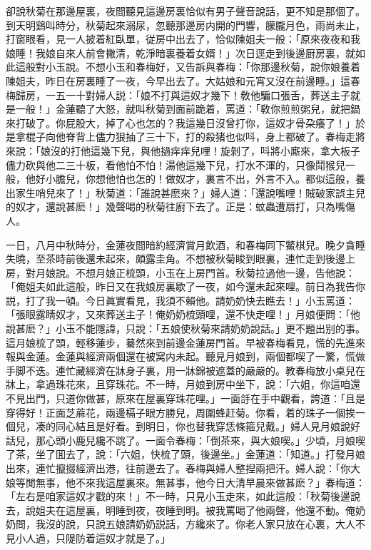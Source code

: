 卻說秋菊在那邊屋裏，夜間聽見這邊房裏恰似有男子聲音說話，更不知是那個了。到天明鷄叫時分，秋菊起來溺尿，忽聽那邊房内開的門響，朦朧月色，雨尚未止，打窗眼看，見一人披着紅臥單，従房中出去了，恰似陳姐夫一般：「原來夜夜和我娘睡！我娘自來人前會撇清，乾淨暗裏養着女婿！」次日逕走到後邊厨房裏，就如此這般對小玉說。不想小玉和春梅好，又告訴與春梅：「你那邊秋菊，說你娘養着陳姐夫，昨日在房裏睡了一夜，今早出去了。大姑娘和元宵又沒在前邊睡。」這春梅歸房，一五一十對婦人説：「娘不打與這奴才幾下！敎他騙口張舌，葬送主子就是一般！」金蓮聽了大怒，就叫秋菊到面前跪着，罵道：「敎你煎煎粥兒，就把鍋來打破了。你屁股大，掉了心也怎的？我這幾日沒曾打你，這奴才骨朶癢了！」於是拿棍子向他脊背上儘力狠抽了三十下，打的殺猪也似呌，身上都破了。春梅走將來說：「娘沒的打他這幾下兒，與他撾痒痒兒哩！旋剝了，呌將小廝來，拿大板子儘力砍與他二三十板，看他怕不怕！湯他這幾下兒，打水不渾的，只像鬦猴兒一般，他好小膽兒，你想他怕也怎的！做奴才，裏言不出，外言不入。都似這般，養出家生哨兒來了！」秋菊道：「誰說甚麽來？」婦人道：「還說嘴哩！賊破家誤主兒的奴才，還說甚麽！」幾聲喝的秋菊往廚下去了。正是：蚊蟲遭扇打，只為嘴傷人。

一日，八月中秋時分，金蓮夜間暗約經濟賞月飲酒，和春梅同下鱉棋兒。晚夕貪睡失曉，至茶時前後還未起來，頗露圭角。不想被秋菊睃到眼裏，連忙走到後邊上房，對月娘說。不想月娘正梳頭，小玉在上房門首。秋菊拉過他一邊，告他說：「俺姐夫如此這般，昨日又在我娘房裏歇了一夜，如今還未起來哩。前日為我告你説，打了我一頓。今日眞實看見，我須不賴他。請奶奶快去瞧去！」小玉罵道：「張眼露睛奴才，又來葬送主子！俺奶奶梳頭哩，還不快走哩！」月娘便問：「他說甚麽？」小玉不能隱諱，只說：「五娘使秋菊來請奶奶說話。」更不題出别的事。這月娘梳了頭，輕移蓮步，驀然來到前邊金蓮房門首。早被春梅看見，慌的先進來報與金蓮。金蓮與經濟兩個還在被窝内未起。聽見月娘到，兩個都喫了一驚，慌做手脚不迭。連忙藏經濟在牀身子裏，用一牀錦被遮蓋的嚴嚴的。教春梅放小桌兒在牀上，拿過珠花來，且穿珠花。不一時，月娘到房中坐下，說：「六姐，你這咱還不見出門，只道你做甚，原來在屋裏穿珠花哩。」一面㧱在手中觀看，誇道：「且是穿得好！正面芝蔴花，兩邊槅子眼方勝兒，周圍蜂赶菊。你看，着的珠子一個挨一個兒，凑的同心結且是好看。到明日，你也替我穿恁條箍兒戴。」婦人見月娘說好話兒，那心頭小鹿兒纔不跳了。一面令春梅：「倒茶來，與大娘喫。」少頃，月娘喫了茶，坐了囬去了，說：「六姐，快梳了頭，後邊坐。」金蓮道：「知道。」打發月娘出來，連忙攛掇經濟出港，往前邊去了。春梅與婦人整揑兩把汗。婦人說：「你大娘等閒無事，他不來我這屋裏來。無甚事，他今日大清早晨來做甚麽？」春梅道：「左右是咱家這奴才戳的來！」不一時，只見小玉走來，如此這般：「秋菊後邊說去，說姐夫在這屋裏，明睡到夜，夜睡到明。被我罵喝了他兩聲，他還不動。俺奶奶問，我沒的說，只說五娘請奶奶説話，方纔來了。你老人家只放在心裏，大人不見小人過，只隄防着這奴才就是了。」

